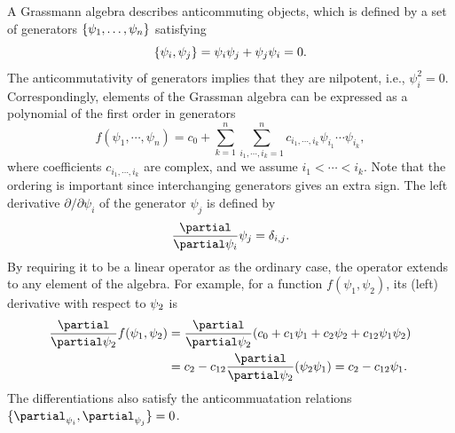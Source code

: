 A Grassmann algebra describes anticommuting objects, which is defined by a set of generators $\{{\psi}_1, \dots,{\psi}_n\}$ satisfying
\begin{equation}
	\{\psi_i, \psi_j\} = {\psi}_i {\psi}_j + {\psi}_j {\psi}_i = 0.
\end{equation}	
The anticommutativity of generators implies that they are nilpotent, i.e., $\psi_i^2 = 0$. Correspondingly, elements of the
Grassman algebra can be expressed as a polynomial of the first order in generators
\begin{equation}
    f(\psi_1, \cdots, \psi_n) = c_0 + \sum_{k=1}^{n}\sum_{i_1,\cdots,i_k = 1}^{n} c_{i_1,\cdots,i_k} \psi_{i_1}\cdots\psi_{i_k},
\end{equation}
where coefficients $c_{i_1, \cdots, i_k}$ are complex, and we assume $i_1 < \cdots < i_k$. Note that the ordering is important since interchanging generators gives an extra sign. 
The left derivative $\partial/\partial \psi_i$ of the generator $\psi_j$ is defined by
\begin{equation}
	\frac{\partial}{\partial \p_i} \p_j = \delta_{i, j}.
\end{equation}
By requiring it to be a linear operator as the ordinary case, the operator extends to any element of the algebra. For example,
for a function $f(\psi_1, \psi_2)$, its (left) derivative with respect to ${\psi}_2$ is
\begin{equation}
	\begin{aligned}
	\frac{\partial}{\partial \p_2} f(\p_1, \p_2) &= \frac{\partial}{\partial \p_2} (c_0 + c_1 \p_1 + c_2 \p_2 + c_{12} \p_1 \p_2) \\
	&= c_2 - c_{12}\frac{\partial}{\partial\p_2}(\p_2 \p_1) = c_2 - c_{12}\p_1.
	\end{aligned}
\end{equation}
The differentiations also satisfy the anticommuatation relations $\{\partial_{\p_i}, \partial_{\p_j}\} = 0$.

